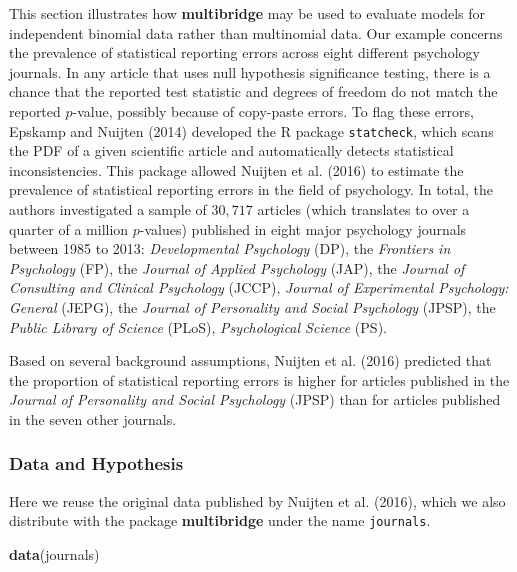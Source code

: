 \documentclass[
  english,
  man,floatsintext]{apa6}
\newenvironment{Shaded}{\begin{snugshade}}{\end{snugshade}}
\newcommand{\KeywordTok}[1]{\textcolor[rgb]{0.13,0.29,0.53}{\textbf{#1}}}
\newcommand{\NormalTok}[1]{#1}
\begin{document}
\noindent This section illustrates how \textbf{multibridge} may be used to evaluate models for independent binomial data rather than multinomial data. Our example concerns the prevalence of statistical reporting errors across eight different psychology journals. In any article that uses null hypothesis significance testing, there is a chance that the reported test statistic and degrees of freedom do not match the reported \(p\)-value, possibly because of copy-paste errors. To flag these errors, Epskamp and Nuijten (2014) developed the R package \texttt{statcheck}, which scans the PDF of a given scientific article and automatically detects statistical inconsistencies. This package allowed Nuijten et al. (2016) to estimate the prevalence of statistical reporting errors in the field of psychology. In total, the authors investigated a sample of \(30{,}717\) articles (which translates to over a quarter of a million \(p\)-values) published in eight major psychology journals between 1985 to 2013: \emph{Developmental Psychology} (DP), the \emph{Frontiers in Psychology} (FP), the \emph{Journal of Applied Psychology} (JAP), the \emph{Journal of Consulting and Clinical Psychology} (JCCP), \emph{Journal of Experimental Psychology: General} (JEPG), the \emph{Journal of Personality and Social Psychology} (JPSP), the \emph{Public Library of Science} (PLoS), \emph{Psychological Science} (PS).

Based on several background assumptions, Nuijten et al. (2016) predicted that the proportion of statistical reporting errors is higher for articles published in the \emph{Journal of Personality and Social Psychology} (JPSP) than for articles published in the seven other journals.

\hypertarget{data-and-hypothesis-1}{%
\subsubsection{Data and Hypothesis}\label{data-and-hypothesis-1}}

Here we reuse the original data published by Nuijten et al. (2016), which we also distribute with the package \textbf{multibridge} under the name \texttt{journals}.

\begin{Shaded}
\begin{Highlighting}[]
\KeywordTok{data}\NormalTok{(journals)}
\end{Highlighting}
\end{Shaded}
\end{document}
